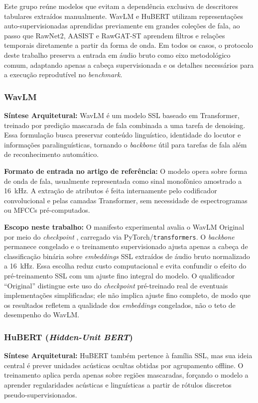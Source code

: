 \documentclass[12pt,a4paper]{article}
\begin{document}
Este grupo reúne modelos que evitam a dependência exclusiva de descritores
tabulares extraídos manualmente. WavLM e HuBERT utilizam representações
auto-supervisionadas aprendidas previamente em grandes coleções de fala, ao
passo que RawNet2, AASIST e RawGAT-ST aprendem filtros e relações temporais
diretamente a partir da forma de onda. Em todos os casos, o protocolo deste
trabalho preserva a entrada em áudio bruto como eixo metodológico comum,
adaptando apenas a cabeça supervisionada e os detalhes necessários para a
execução reprodutível no \textit{benchmark}.

\subsubsection*{WavLM \cite{chen2022wavlm}}
\textbf{Síntese Arquitetural:} WavLM é um modelo SSL baseado em Transformer,
treinado por predição mascarada de fala combinada a uma tarefa de denoising.
Essa formulação busca preservar conteúdo linguístico, identidade do locutor e
informações paralinguísticas, tornando o \textit{backbone} útil para tarefas de
fala além de reconhecimento automático.

\par\textbf{Formato de entrada no artigo de referência:} O modelo opera sobre
forma de onda de fala, usualmente representada como sinal monofônico amostrado
a \SI{16}{\kilo\hertz}. A extração de atributos é feita internamente pelo
codificador convolucional e pelas camadas Transformer, sem necessidade de
espectrogramas ou MFCCs pré-computados.

\par\textbf{Escopo neste trabalho:} O manifesto experimental avalia o WavLM
Original por meio do \textit{checkpoint} , carregado
via PyTorch/\texttt{transformers}. O \textit{backbone} permanece congelado e o
treinamento supervisionado ajusta apenas a cabeça de classificação binária
sobre \textit{embeddings} SSL extraídos de áudio bruto normalizado a
\SI{16}{\kilo\hertz}. Essa escolha reduz custo computacional e evita confundir
o efeito do pré-treinamento SSL com um ajuste fino integral do modelo. O
qualificador ``Original'' distingue este uso do \textit{checkpoint} pré-treinado
real de eventuais implementações simplificadas; ele não implica ajuste fino
completo, de modo que os resultados refletem a qualidade dos \textit{embeddings}
congelados, não o teto de desempenho do WavLM.

\subsubsection*{HuBERT (\textit{Hidden-Unit BERT}) \cite{hsu2021hubert}}
\textbf{Síntese Arquitetural:} HuBERT também pertence à família SSL, mas sua
ideia central é prever unidades acústicas ocultas obtidas por agrupamento
offline. O treinamento aplica perda apenas sobre regiões mascaradas, forçando o
modelo a aprender regularidades acústicas e linguísticas a partir de rótulos
discretos pseudo-supervisionados.
\end{document}
